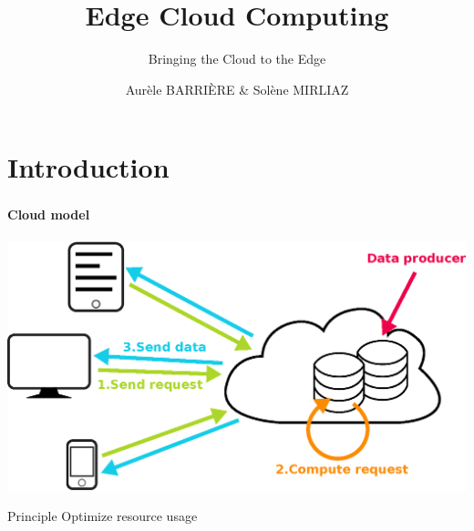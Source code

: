 \documentclass[utf8,xcolor=table, page number]{earlywinter}
\begin{document}
\title{Edge Cloud Computing}
\subtitle{Bringing the Cloud to the Edge}
\author{Aurèle BARRIÈRE & Solène MIRLIAZ}

\begin{frame}[plain]
  \titlepage%
\end{frame}

\section*{Introduction}
\begin{frame}
	\frametitle{\secname}
  \framesubtitle{Cloud model}
  \begin{center}
    \includegraphics[width=0.7\linewidth]{cloud.eps}
  \end{center}
  \begin{block}{Principle}
    Optimize resource usage
  \end{block}
\end{frame}
\end{document}

